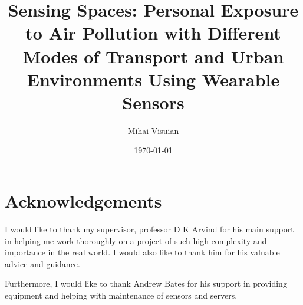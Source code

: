 \documentclass[bsc,frontabs,twoside,singlespacing,parskip,deptreport]{infthesis}     %
\begin{document}
\title{Sensing Spaces: Personal Exposure to Air Pollution with Different Modes of Transport and Urban Environments Using Wearable Sensors}

\author{Mihai Visuian}



\date{\today}


\maketitle

\section*{Acknowledgements}

I would like to thank my supervisor, professor D K Arvind for his main support in helping me work thoroughly on a project of such high complexity and importance in the real world. I would also like to thank him for his valuable advice and guidance.

Furthermore, I would like to thank Andrew Bates for his support in providing equipment and helping with maintenance of sensors and servers.
\end{document}
